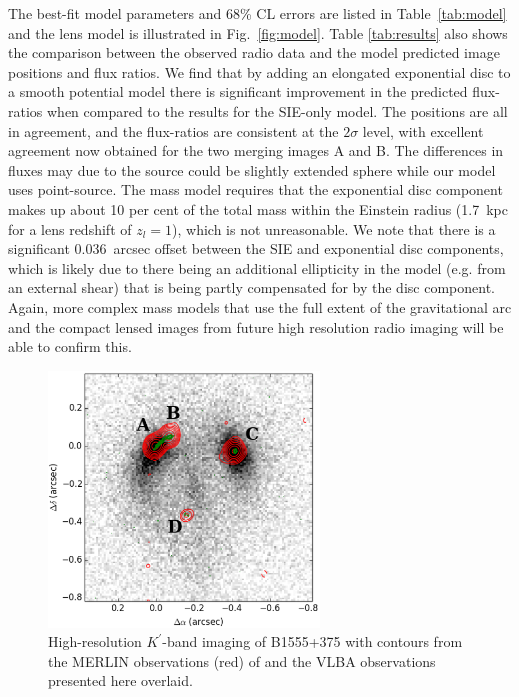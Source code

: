 \documentclass[a4paper,fleqn,usenatbib,useAMS]{mnras}
\begin{document}
The best-fit model parameters and 68\% CL errors are listed in Table~\ref{tab:model} and the lens model is illustrated in Fig.~\ref{fig:model}. Table \ref{tab:results} also shows the comparison between the observed radio data and the model predicted image positions and flux ratios. We find that by adding an elongated exponential disc to a smooth potential model there is significant improvement in the predicted flux-ratios when compared to the results for the SIE-only model. 
The positions are all in agreement, and the flux-ratios are consistent at the $2\sigma$ level, with excellent agreement now obtained for the two merging images A and B. The differences in fluxes may due to the source could be slightly extended sphere while our model uses point-source. The mass model requires that the exponential disc component makes up about 10 per cent of the total mass within the Einstein radius (1.7~kpc for a lens redshift of $z_l = 1$), which is not unreasonable. We note that there is a significant 0.036~arcsec offset between the SIE and exponential disc components, which is likely due to there being an additional ellipticity in the model (e.g. from an external shear) that is being partly compensated for by the disc component. Again, more complex mass models that use the full extent of the gravitational arc and the compact lensed images from future high resolution radio imaging will be able to confirm this.

\begin{figure}
\includegraphics[width=72mm]{fig2_twocontour_g.eps}
\caption{High-resolution $K^\prime$-band imaging of B1555+375 with contours from the MERLIN observations (red) of \citet{Marlow99} and the VLBA observations presented here overlaid.}
\label{fig:merlin}
\end{figure}
\end{document}
